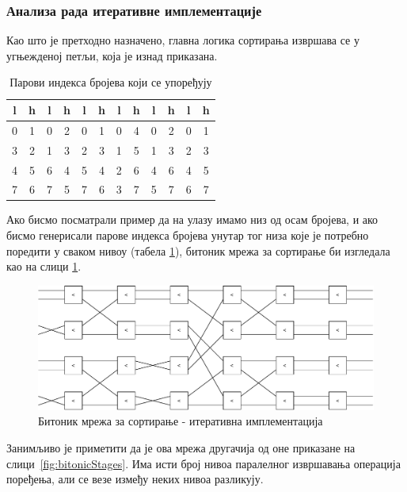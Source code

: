 \documentclass[12pt, a4paper]{article}
\theoremstyle{definition}
\begin{document}
\begin{enumerate}
\end{enumerate}

\subsubsection{Анализа рада итеративне имплементације}
Као што је претходно назначено, главна логика сортирања извршава се у угњежденој петљи, која је изнад приказана.
\begin{table}[H]
\centering
 \begin{tabular}{| c c | c c | c c | c c | c c | c c |}
  \hline
  l & h & l & h & l & h & l & h & l & h & l & h \\
  \hline
  0 & 1 & 0 & 2 & 0 & 1 & 0 & 4 & 0 & 2 & 0 & 1 \\
  3 & 2 & 1 & 3 & 2 & 3 & 1 & 5 & 1 & 3 & 2 & 3 \\
  4 & 5 & 6 & 4 & 5 & 4 & 2 & 6 & 4 & 6 & 4 & 5 \\
  7 & 6 & 7 & 5 & 7 & 6 & 3 & 7 & 5 & 7 & 6 & 7 \\
  \hline
 \end{tabular}
 \caption{Парови индекса бројева који се упоређују}
 \label{tab:index}
\end{table}
Ако бисмо посматрали пример да на улазу имамо низ од осам бројева, и ако бисмо генерисали парове индекса бројева унутар тог низа које је потребно поредити у сваком нивоу (табела \ref{tab:index}), битоник мрежа за сортирање би изгледала као на слици \ref{fig:bitonicIter}.

\begin{figure}[H]
  \centering
      \includegraphics[scale=0.7]{slike/bitonicIter.pdf}
  \caption{Битоник мрежа за сортирање - итеративна имплементација}
  \label{fig:bitonicIter}
\end{figure}

Занимљиво је приметити да је ова мрежа другачија од оне приказане на \mbox{слици \ref{fig:bitonicStages}}. Има исти број нивоа паралелног извршавања операција поређења, али се везе између неких нивоа разликују.
\end{document}
